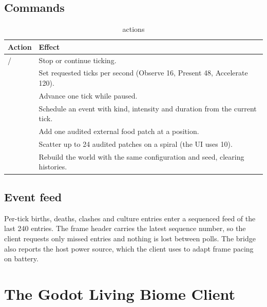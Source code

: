 \section{Commands}
\begin{table}[htbp]
\centering
\caption{ actions}
\begin{tabularx}{\textwidth}{lL}
\toprule
Action & Effect \\
\midrule
{} /  & Stop or continue ticking. \\
 & Set requested ticks per second (Observe 16, Present 48, Accelerate 120). \\
 & Advance one tick while paused. \\
 & Schedule an event with kind, intensity and duration from the current tick. \\
 & Add one audited external food patch at a position. \\
 & Scatter up to 24 audited patches on a spiral (the UI uses 10). \\
 & Rebuild the world with the same configuration and seed, clearing histories. \\
\bottomrule
\end{tabularx}
\end{table}

\section{Event feed}
Per-tick births, deaths, clashes and culture entries enter a sequenced feed of the
last 240 entries. The frame header carries the latest sequence number, so the
client requests only missed entries and nothing is lost between polls. The bridge
also reports the host power source, which the client uses to adapt frame pacing on
battery.

\chapter{The Godot Living Biome Client}

